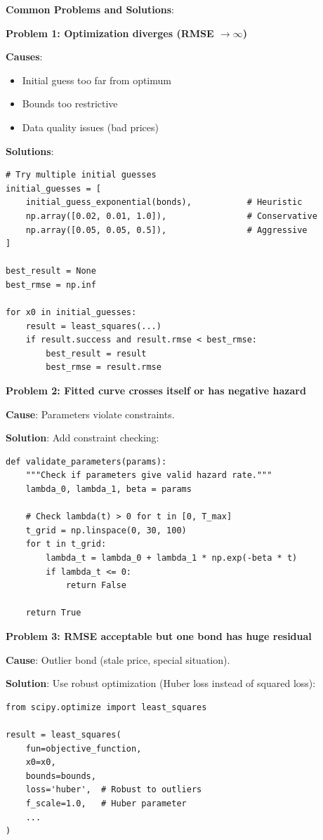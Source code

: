 \documentclass[11pt,a4paper]{article}
\begin{document}
\begin{warnbox}
\textbf{Common Problems and Solutions}:

\textbf{Problem 1: Optimization diverges (RMSE $\to \infty$)}

\textbf{Causes}:
\begin{itemize}
    \item Initial guess too far from optimum
    \item Bounds too restrictive
    \item Data quality issues (bad prices)
\end{itemize}

\textbf{Solutions}:
\begin{lstlisting}
# Try multiple initial guesses
initial_guesses = [
    initial_guess_exponential(bonds),           # Heuristic
    np.array([0.02, 0.01, 1.0]),                # Conservative
    np.array([0.05, 0.05, 0.5]),                # Aggressive
]

best_result = None
best_rmse = np.inf

for x0 in initial_guesses:
    result = least_squares(...)
    if result.success and result.rmse < best_rmse:
        best_result = result
        best_rmse = result.rmse
\end{lstlisting}

\textbf{Problem 2: Fitted curve crosses itself or has negative hazard}

\textbf{Cause}: Parameters violate constraints.

\textbf{Solution}: Add constraint checking:
\begin{lstlisting}
def validate_parameters(params):
    """Check if parameters give valid hazard rate."""
    lambda_0, lambda_1, beta = params
    
    # Check lambda(t) > 0 for t in [0, T_max]
    t_grid = np.linspace(0, 30, 100)
    for t in t_grid:
        lambda_t = lambda_0 + lambda_1 * np.exp(-beta * t)
        if lambda_t <= 0:
            return False
    
    return True
\end{lstlisting}

\textbf{Problem 3: RMSE acceptable but one bond has huge residual}

\textbf{Cause}: Outlier bond (stale price, special situation).

\textbf{Solution}: Use robust optimization (Huber loss instead of squared loss):
\begin{lstlisting}
from scipy.optimize import least_squares

result = least_squares(
    fun=objective_function,
    x0=x0,
    bounds=bounds,
    loss='huber',  # Robust to outliers
    f_scale=1.0,   # Huber parameter
    ...
)
\end{lstlisting}
\end{warnbox}
\end{document}
